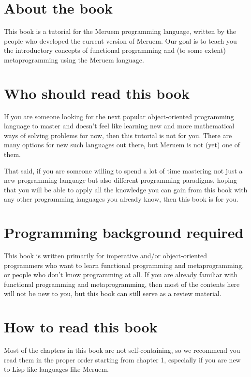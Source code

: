 \section{About the book}
This book is a tutorial for the Meruem programming language, written by the people who developed the current version of Meruem. Our goal is to teach you the introductory concepts of functional programming and (to some extent) metaprogramming using the Meruem language. 

\section{Who should read this book}
If you are someone looking for the next popular object-oriented programming language to master and doesn't feel like learning new and more mathematical ways of solving problems for now, then this tutorial is not for you. There are many options for new such languages out there, but Meruem is not (yet) one of them.

That said, if you are someone willing to spend a lot of time mastering not just a new programming language but also different programming paradigms, hoping that you will be able to apply all the knowledge you can gain from this book with any other programming languages you already know, then this book is for you.

\section{Programming background required}
This book is written primarily for imperative and/or object-oriented programmers who want to learn functional programming and metaprogramming, or people who don't know programming at all. If you are already familiar with functional programming and metaprogramming, then most of the contents here will not be new to you, but this book can still serve as a review material.

\section{How to read this book}
Most of the chapters in this book are not self-containing, so we recommend you read them in the proper order starting from chapter 1, especially if you are new to Lisp-like languages like Meruem. 